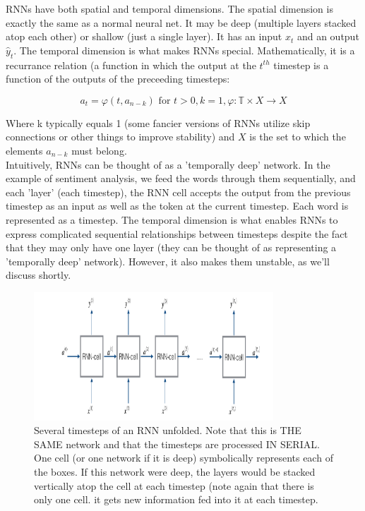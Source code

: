 \documentclass[12pt]{article}
\begin{document}
RNNs have both spatial and temporal dimensions. The spatial dimension is exactly the same as a normal neural net. It may be deep (multiple layers stacked atop each other) or shallow (just a single layer). It has an input \(x_t\) and an output \(\hat{y}_t\). The temporal dimension is what makes RNNs special. Mathematically, it is a recurrance relation (a function in which the output at the \(t^{th}\) timestep is a function of the outputs of the preceeding timesteps:

\[a_t = \varphi(t, a_{n-k}) \text{ for } t > 0, k = 1, \varphi: \mathbb{T}\times X \rightarrow X\]

Where k typically equals 1 (some fancier versions of RNNs utilize skip connections or other things to improve stability) and \(X\) is the set to which the elements \(a_{n-k}\) must belong. \\

Intuitively, RNNs can be thought of as a 'temporally deep' network. In the example of sentiment analysis, we feed the words through them sequentially, and each 'layer' (each timestep), the RNN cell accepts the output from the previous timestep as an input as well as the token at the current timestep. Each word is represented as a timestep. The temporal dimension is what enables RNNs to express complicated sequential relationships between timesteps despite the fact that they may only have one layer (they can be thought of as representing a 'temporally deep' network). However, it also makes them unstable, as we'll discuss shortly.

\begin{figure}[H]
    \centering
    \includegraphics[width=0.8\textwidth]{./RNN_network.png} %
    \caption{Several timesteps of an RNN unfolded. Note that this is THE SAME network and that the timesteps are processed IN SERIAL. One cell (or one network if it is deep) symbolically represents each of the boxes. If this network were deep, the layers would be stacked vertically atop the cell at each timestep (note again that there is only one cell. it gets new information fed into it at each timestep.}
\end{figure}
\end{document}
